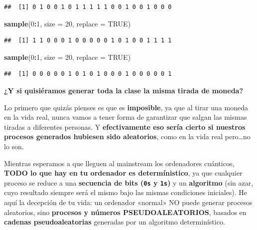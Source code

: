 \documentclass[11pt,]{book}
\newenvironment{Shaded}{\begin{snugshade}}{\end{snugshade}}
\newcommand{\DataTypeTok}[1]{\textcolor[rgb]{0.27,0.27,0.27}{#1}}
\newcommand{\DecValTok}[1]{\textcolor[rgb]{0.06,0.06,0.06}{#1}}
\newcommand{\KeywordTok}[1]{\textcolor[rgb]{0.27,0.27,0.27}{\textbf{#1}}}
\newcommand{\NormalTok}[1]{#1}
\newcommand{\OperatorTok}[1]{\textcolor[rgb]{0.43,0.43,0.43}{\textbf{#1}}}
\newcommand{\OtherTok}[1]{\textcolor[rgb]{0.37,0.37,0.37}{#1}}
\begin{document}
\begin{verbatim}
##  [1] 0 1 0 0 1 0 1 1 1 1 1 0 0 1 0 0 1 0 0 0
\end{verbatim}

\begin{Shaded}
\begin{Highlighting}[]
\KeywordTok{sample}\NormalTok{(}\DecValTok{0}\OperatorTok{:}\DecValTok{1}\NormalTok{, }\DataTypeTok{size =} \DecValTok{20}\NormalTok{, }\DataTypeTok{replace =} \OtherTok{TRUE}\NormalTok{)}
\end{Highlighting}
\end{Shaded}

\begin{verbatim}
##  [1] 1 1 0 0 0 1 0 0 0 0 0 1 0 1 0 0 1 1 1 1
\end{verbatim}

\begin{Shaded}
\begin{Highlighting}[]
\KeywordTok{sample}\NormalTok{(}\DecValTok{0}\OperatorTok{:}\DecValTok{1}\NormalTok{, }\DataTypeTok{size =} \DecValTok{20}\NormalTok{, }\DataTypeTok{replace =} \OtherTok{TRUE}\NormalTok{)}
\end{Highlighting}
\end{Shaded}

\begin{verbatim}
##  [1] 0 0 0 0 0 1 0 1 0 1 0 0 0 1 0 0 0 0 0 1
\end{verbatim}

\textbf{¿Y si quisiéramos generar toda la clase la misma tirada de moneda?}

Lo primero que quizás pienses es que es \textbf{imposible}, ya que al tirar una moneda en la vida real, nunca vamos a tener forma de garantizar que salgan las mismas tiradas a diferentes personas. Y \textbf{efectivamente eso sería cierto si nuestros procesos generados hubiesen sido aleatorios}, como en la vida real pero\ldots{}no lo son.

Mientras esperamos a que lleguen al mainstream los ordenadores cuánticos, \textbf{TODO lo que hay en tu ordenador es determínistico}, ya que cualquier proceso se reduce a una \textbf{secuencia de bits (\texttt{0\textquotesingle{}s} y \texttt{1\textquotesingle{}s})} y un \textbf{algoritmo} (sin azar, cuyo resultado siempre será el mismo bajo las mismas condiciones iniciales). He aquí la decepción de tu vida: un ordenador «normal» NO puede generar procesos aleatorios, sino \textbf{procesos y números PSEUDOALEATORIOS}, basados en \textbf{cadenas pseudoaleatorias} generadas por un algoritmo determinístico.
\end{document}
